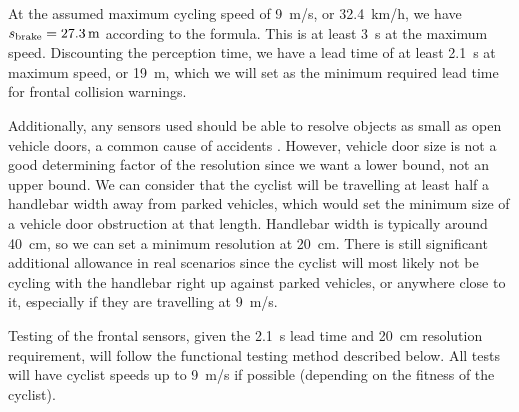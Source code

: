 \documentclass[journal]{IEEEtran}
\begin{document}
At the assumed maximum cycling speed of \SI{9}{\meter/\s}, or \SI{32.4}{\km/\hour}, we have $s_\text{brake} = \SI{27.3}{\meter}$ according to the formula. This is at least \SI{3}{\s} at the maximum speed. Discounting the perception time, we have a lead time of at least \SI{2.1}{\s} at maximum speed, or \SI{19}{\meter}, which we will set as the minimum required lead time for frontal collision warnings.

Additionally, any sensors used should be able to resolve objects as small as open vehicle doors, a common cause of accidents \cite{biking_cases}. However, vehicle door size is not a good determining factor of the resolution since we want a lower bound, not an upper bound. We can consider that the cyclist will be travelling at least half a handlebar width away from parked vehicles, which would set the minimum size of a vehicle door obstruction at that length. Handlebar width is typically around \SI{40}{\cm}, so we can set a minimum resolution at \SI{20}{\cm}. There is still significant additional allowance in real scenarios since the cyclist will most likely not be cycling with the handlebar right up against parked vehicles, or anywhere close to it, especially if they are travelling at \SI{9}{\meter/\s}.

Testing of the frontal sensors, given the \SI{2.1}{\s} lead time and \SI{20}{\cm} resolution requirement, will follow the functional testing method described below. All tests will have cyclist speeds up to \SI{9}{\meter/\s} if possible (depending on the fitness of the cyclist). 
\end{document}
